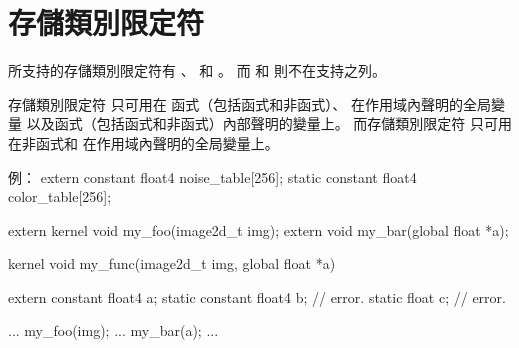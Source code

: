 \section{存儲類別限定符}

所支持的存儲類別限定符有 、  和 。
而  和  則不在支持之列。

存儲類別限定符  只可用在
函式（包括函式和非函式）、
在作用域內聲明的全局變量
以及函式（包括函式和非函式）內部聲明的變量上。
而存儲類別限定符  只可用在非函式和
在作用域內聲明的全局變量上。

例：
\startclc
extern constant float4 noise_table[256];
static constant float4 color_table[256];

extern kernel void my_foo(image2d_t img);
extern void my_bar(global float *a);

kernel void my_func(image2d_t img, global float *a)
{
	extern constant float4 a;
	static constant float4 b;	// error.
	static float c;			// error.

	...
	my_foo(img);
	...
	my_bar(a);
	...
}
\stopclc
